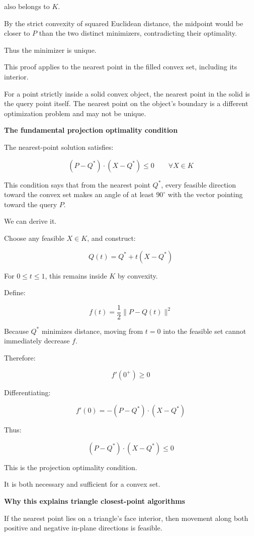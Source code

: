 also belongs to \(K\).

By the strict convexity of squared Euclidean distance, the midpoint would be closer to \(P\) than the two distinct minimizers, contradicting their optimality.

Thus the minimizer is unique.

This proof applies to the nearest point in the filled convex set, including its interior.

For a point strictly inside a solid convex object, the nearest point in the solid is the query point itself. The nearest point on the object's boundary is a different optimization problem and may not be unique.

\textbf{The fundamental projection optimality condition}

The nearest-point solution satisfies:

\[
\boxed{ (P-Q^*)\cdot(X-Q^*)\le0 \qquad\forall X\in K }
\]

This condition says that from the nearest point \(Q^*\), every feasible direction toward the convex set makes an angle of at least \(90^\circ\) with the vector pointing toward the query \(P\).

We can derive it.

Choose any feasible \(X\in K\), and construct:

\[
Q(t)=Q^*+t(X-Q^*)
\]

For \(0\le t\le1\), this remains inside \(K\) by convexity.

Define:

\[
f(t)=\frac12\|P-Q(t)\|^2
\]

Because \(Q^*\) minimizes distance, moving from \(t=0\) into the feasible set cannot immediately decrease \(f\).

Therefore:

\[
f'(0^+)\ge0
\]

Differentiating:

\[
f'(0)=-(P-Q^*)\cdot(X-Q^*)
\]

Thus:

\[
(P-Q^*)\cdot(X-Q^*)\le0
\]

This is the projection optimality condition.

It is both necessary and sufficient for a convex set.

\textbf{Why this explains triangle closest-point algorithms}

If the nearest point lies on a triangle's face interior, then movement along both positive and negative in-plane directions is feasible.

